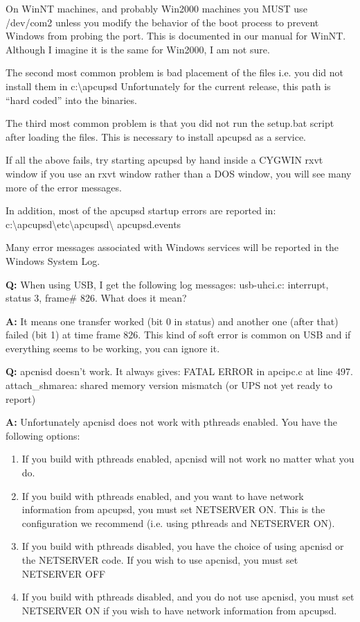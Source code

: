 \begin{description}
On WinNT machines, and probably Win2000 machines you MUST use /dev/com2 unless
you modify the behavior of the boot process to prevent Windows from probing
the port. This is documented in our manual for WinNT. Although I imagine it is
the same for Win2000, I am not sure.  

The second most common problem is bad placement of the files i.e. you did not
install them in c:\textbackslash{}apcupsd Unfortunately for the current
release, this path is ``hard coded'' into the binaries.  

The third most common problem is that you did not run the setup.bat script
after loading the files. This is necessary to install apcupsd as a service.  

If all the above fails, try starting apcupsd by hand inside a CYGWIN rxvt
window if you use an rxvt window rather than a DOS window, you will see many
more of the error messages.  

In addition, most of the apcupsd startup errors are reported in:
c:\textbackslash{}apcupsd\textbackslash{}etc\textbackslash{}apcupsd\textbackslash
{}apcupsd.events  

Many error messages associated with Windows services will be reported in the
Windows System Log.  

\item {\bf Q:}
When using USB, I get the following log messages: usb-uhci.c: interrupt,
status 3, frame\# 826. What does it mean?  

\item {\bf A:}
It means one transfer worked (bit 0 in status) and another one (after that)
failed (bit 1) at time frame 826. This kind of soft error is common on USB and
if everything seems to be working, you can ignore it.  

\item {\bf Q:}
apcnisd doesn't work. It always gives: FATAL ERROR in apcipc.c at line 497.
attach\_shmarea: shared memory version mismatch (or UPS not yet ready to
report)  

\item {\bf A:}
Unfortunately apcnisd does not work with pthreads enabled. You have the
following options:  

\begin{enumerate}
\item If you build with pthreads enabled, apcnisd will not work no matter what
you do.  
\item If you build with pthreads enabled, and you want to have network
information from apcupsd, you must set NETSERVER ON. This is the configuration
we recommend (i.e. using pthreads and NETSERVER ON).  
\item If you build with pthreads disabled, you have the choice of using
apcnisd or the NETSERVER code. If you wish to use apcnisd, you must set
NETSERVER OFF  
\item If you build with pthreads disabled, and you do not use apcnisd, you
must set NETSERVER ON if you wish to have network information from apcupsd.  
\end{enumerate}


\end{description}
